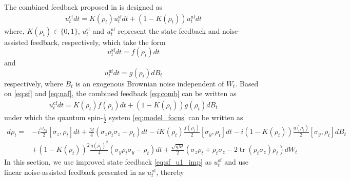 \documentclass[]{elsarticle}
\begin{document}
The combined feedback proposed in \cite{WSJZJ2021c} is designed as
\begin{equation}\label{eq:comb}
	\begin{aligned}
		u_t^{\mathrm{cf}}dt=K\left(\rho_t\right) u_t^{\mathrm{sf}}dt+ \left(1-K\left(\rho_t\right)\right)u_t^{\mathrm{nf}}dt
	\end{aligned}
\end{equation}
where, $K\left(\rho_t\right)\in\{0,1\}$, $u_t^{\mathrm{sf}}$ and $u_t^{\mathrm{nf}}$ represent the state feedback and noise-assisted feedback, respectively, which take the form
\begin{equation}\label{eq:sf}
	u_t^{\mathrm{sf}}dt=f\left(\rho_t\right)dt
\end{equation}
and
\begin{equation}\label{eq:naf}
	u_t^{\mathrm{nf}}dt=g\left(\rho_t\right)dB_t
\end{equation}
respectively, where $B_t$ is an exogenous Brownian noise independent of $W_t$. Based on \eqref{eq:sf} and \eqref{eq:naf}, the combined feedback \eqref{eq:comb} can be written as
\begin{equation}\label{eq:comb_1}
	\begin{aligned}
		u_t^{\mathrm{cf}}dt=K\left(\rho_t\right) f\left(\rho_t\right)dt+\left(1-K\left(\rho_t\right)\right)g\left(\rho_t\right)dB_t
	\end{aligned}
\end{equation}
under which the quantum spin-$\frac{1}{2}$ system \eqref{eq:model_focus} can be written as
\begin{equation}\label{eq:model_focus_1}
	\begin{aligned}
		d \rho_t=&-{{i}}\frac{\omega_{eg}}{2}\left[\sigma_z, \rho_{t}\right]dt+\frac{M}{4}\left(\sigma_z \rho_t \sigma_z-\rho_t\right) d t-{{i}} K\left(\rho_t\right) \frac{f\left(\rho_t\right)}{2}\left[\sigma_{y}, \rho_{t}\right] dt-{{i}} \left(1-K\left(\rho_t\right)\right)\frac{g\left(\rho_t\right)}{2}[\sigma_y, \rho_t] d B_t\\
		&+\left(1-K\left(\rho_t\right)\right)^2\frac{g\left(\rho_t\right)^{2}}{4}\left(\sigma_y \rho_t \sigma_y-\rho_t\right) d t+\frac{\sqrt{\eta M}}{2} \left(\sigma_z \rho_t+\rho_t \sigma_z-2 \operatorname{tr}\left(\rho_t \sigma_z\right) \rho_t\right) d W_t
	\end{aligned}
\end{equation}
In this section, we use improved state feedback \eqref{eq:sf_u1_imp} as $u_t^{\mathrm{sf}}$ and use linear noise-assisted feedback presented in \cite{WSJZJ2021} as $u_t^{\mathrm{nf}}$, thereby
\end{document}
